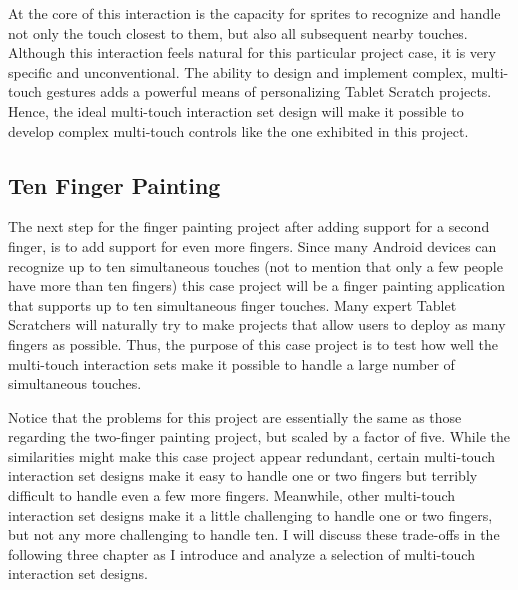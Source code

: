 At the core of this interaction is the capacity for sprites to recognize and handle not only the touch closest to them, but also all subsequent nearby touches. Although this interaction feels natural for this particular project case, it is very specific and unconventional. The ability to design and implement complex, multi-touch gestures adds a powerful means of personalizing Tablet Scratch projects. Hence, the ideal multi-touch interaction set design will make it possible to develop complex multi-touch controls like the one exhibited in this project.

\subsection{Ten Finger Painting}
The next step for the finger painting project after adding support for a second finger, is to add support for even more fingers. Since many Android devices can recognize up to ten simultaneous touches (not to mention that only a few people have more than ten fingers) this case project will be a finger painting application that supports up to ten simultaneous finger touches. Many expert Tablet Scratchers will naturally try to make projects that allow users to deploy as many fingers as possible. Thus, the purpose of this case project is to test how well the multi-touch interaction sets make it possible to handle a large number of simultaneous touches. 

Notice that the problems for this project are essentially the same as those regarding the two-finger painting project, but scaled by a factor of five. While the similarities might make this case project appear redundant, certain multi-touch interaction set designs make it easy to handle one or two fingers but terribly difficult to handle even a few more fingers. Meanwhile, other multi-touch interaction set designs make it a little challenging to handle one or two fingers, but not any more challenging to handle ten. I will discuss these trade-offs in the following three chapter as I introduce and analyze a selection of multi-touch interaction set designs.
